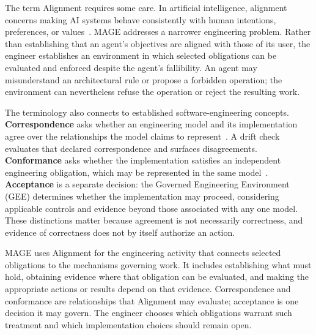 The term Alignment requires some care. In artificial intelligence, alignment concerns making AI systems behave consistently with human intentions, preferences, or values~\citep{gabriel2020artificial,ji2024ai}. MAGE addresses a narrower engineering problem. Rather than establishing that an agent's objectives are aligned with those of its user, the engineer establishes an environment in which selected obligations can be evaluated and enforced despite the agent's fallibility. An agent may misunderstand an architectural rule or propose a forbidden operation; the environment can nevertheless refuse the operation or reject the resulting work.


The terminology also connects to established software-engineering concepts. \textbf{Correspondence} asks whether an engineering model and its implementation agree over the relationships the model claims to represent~\citep{murphy1995reflexion}. A drift check evaluates that declared correspondence and surfaces disagreements. \textbf{Conformance} asks whether the implementation satisfies an independent engineering obligation, which may be represented in the same model~\citep{passos2010conformance}. \textbf{Acceptance} is a separate decision: the Governed Engineering Environment (GEE) determines whether the implementation may proceed, considering applicable controls and evidence beyond those associated with any one model. These distinctions matter because agreement is not necessarily correctness, and evidence of correctness does not by itself authorize an action.

MAGE uses Alignment for the engineering activity that connects selected obligations to the mechanisms governing work. It includes establishing what must hold, obtaining evidence where that obligation can be evaluated, and making the appropriate actions or results depend on that evidence. Correspondence and conformance are relationships that Alignment may evaluate; acceptance is one decision it may govern. The engineer chooses which obligations warrant such treatment and which implementation choices should remain open.


